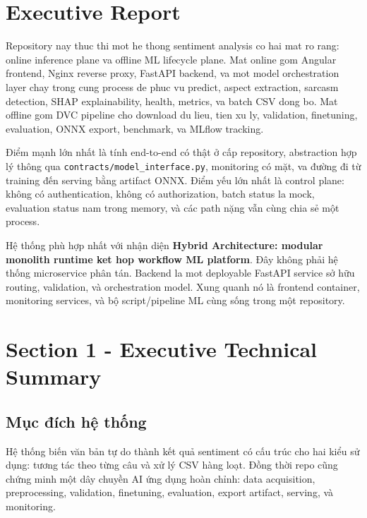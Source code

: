 \tableofcontents
\newpage

\section*{Executive Report}
Repository nay thuc thi mot he thong sentiment analysis co hai mat ro rang: online inference plane va offline ML lifecycle plane. Mat online gom Angular frontend, Nginx reverse proxy, FastAPI backend, va mot model orchestration layer chay trong cung process de phuc vu predict, aspect extraction, sarcasm detection, SHAP explainability, health, metrics, va batch CSV dong bo. Mat offline gom DVC pipeline cho download du lieu, tien xu ly, validation, finetuning, evaluation, ONNX export, benchmark, va MLflow tracking.

Điểm mạnh lớn nhất là tính end-to-end có thật ở cấp repository, abstraction hợp lý thông qua \texttt{contracts/model\_interface.py}, monitoring có mặt, va đường đi từ training đến serving bằng artifact ONNX. Điểm yếu lớn nhất là control plane: không có authentication, không có authorization, batch status la mock, evaluation status nam trong memory, và các path nặng vẫn cùng chia sẻ một process.

Hệ thống phù hợp nhất với nhận diện \textbf{Hybrid Architecture: modular monolith runtime ket hop workflow ML platform}. Đây không phải hệ thống microservice phân tán. Backend la mot deployable FastAPI service sở hữu routing, validation, và orchestration model. Xung quanh nó là frontend container, monitoring services, và bộ script/pipeline ML cùng sống trong một repository.


\section{Section 1 - Executive Technical Summary}
\subsection{Mục đích hệ thống}
Hệ thống biến văn bản tự do thành kết quả sentiment có cấu trúc cho hai kiểu sử dụng: tương tác theo từng câu và xử lý CSV hàng loạt. Đồng thời repo cũng chứng minh một dây chuyền AI ứng dụng hoàn chỉnh: data acquisition, preprocessing, validation, finetuning, evaluation, export artifact, serving, và monitoring.

